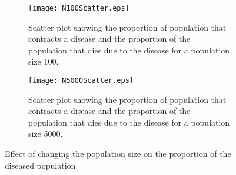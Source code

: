 
\begin{figure}[h!]
 \centering 
 \begin{subfigure}[b]{0.45\textwidth}
  \texttt{[image: N100Scatter.eps]} \caption{Scatter plot showing the proportion of population that contracts a disease and the proportion of the population that dies due to the disease for a population size 100.} \label{fig:Scatter100} \end{subfigure}
 \hspace{.1cm}
\begin{subfigure}[b]{0.45\textwidth}
 \texttt{[image: N5000Scatter.eps]} \caption{Scatter plot showing the proportion of population that contracts a disease and the proportion of the population that dies due to the disease for a population size 5000.} \label{fig:Scatter5000} \end{subfigure} \caption{Effect of changing the population size on the proportion of the diseased population}
\label{fig:VarPopSize} 
\end{figure}














